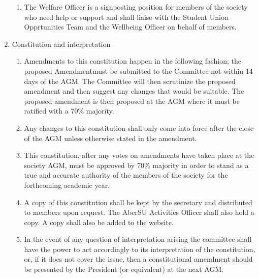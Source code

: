 \documentclass{article}
\begin{document}
\begin{enumerate}
\begin{enumerate}
            \item The Welfare Officer is a signposting position for members of the society who need help or support and shall liaise with the Student Union Opprtunities Team and the Wellbeing Officer on behalf of members.
        \end{enumerate}
    \item Constitution and interpretation
        \begin{enumerate}
            \item Amendments to this constitution happen in the following fashion; the proposed Amendmentmust be submitted to the Committee not within 14 days of the AGM. The Committee will then scrutinize the proposed amendment and then suggest any changes that would be suitable. The proposed amendment is then proposed at the AGM where it must be ratified with a 70\% majority.
            \item Any changes to this constitution shall only come into force after the close of the AGM unless otherwise stated in the amendment.
            \item This constitution, after any votes on amendments have taken place at the society AGM, must be approved by 70\% majority in order to stand as a true and accurate authority of the members of the society for the forthcoming academic year.
            \item A copy of this constitution shall be kept by the secretary and distributed to members upon request. The AberSU Activities Officer shall also hold a copy. A copy shall also be added to the website.
            \item In the event of any question of interpretation arising the committee shall have the power to act accordingly to its interpretation of the constitution, or, if it does not cover the issue, then a constitutional amendment should be presented by the President (or equivalent) at the next AGM.
        \end{enumerate}
\end{enumerate}
\end{document}
